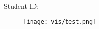 \begin{titlepage}
    \centering
    \vspace*{0.2cm}
    
    {\Huge \mytitle \par}
    \vspace{1.4cm}
    
    {\Large \myassignment \par}    
    {\Large \mycourse \par}
    \vspace{1.4cm}
    
    {\Large \myname \par}

    {\Large Student ID: \myid \par}

    \vspace{0.9cm}


    \begin{figure}[htb]
        \centering
        \texttt{[image: vis/test.png]}
        \caption*{}
    \end{figure}

    \vfill
    
    {\Large \mydate \par}
\end{titlepage}